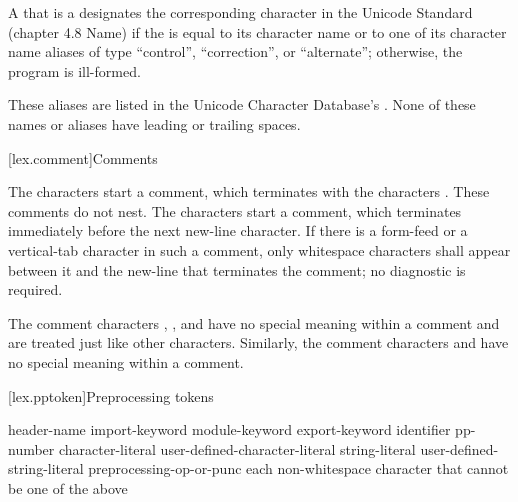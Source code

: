 \pnum
A 
that is a 
designates the corresponding character
in the Unicode Standard (chapter 4.8 Name)
if the  is equal
to its character name or
to one of its character name aliases of
type ``control'', ``correction'', or ``alternate'';
otherwise, the program is ill-formed.
\begin{note}
These aliases are listed in
the Unicode Character Database's .
None of these names or aliases have leading or trailing spaces.
\end{note}

[lex.comment]{Comments}

\pnum
{}%
%
%
The characters \tcode{/*} start a comment, which terminates with the
characters \tcode{*/}. These comments do not nest.
%
The characters \tcode{//} start a comment, which terminates immediately before the
next new-line character. If there is a form-feed or a vertical-tab
character in such a comment, only whitespace characters shall appear
between it and the new-line that terminates the comment; no diagnostic
is required.
\begin{note}
The comment characters \tcode{//}, \tcode{/*},
and \tcode{*/} have no special meaning within a \tcode{//} comment and
are treated just like other characters. Similarly, the comment
characters \tcode{//} and \tcode{/*} have no special meaning within a
\tcode{/*} comment.
\end{note}

[lex.pptoken]{Preprocessing tokens}

%
\begin{bnf}
\br
    header-name\br
    import-keyword\br
    module-keyword\br
    export-keyword\br
    identifier\br
    pp-number\br
    character-literal\br
    user-defined-character-literal\br
    string-literal\br
    user-defined-string-literal\br
    preprocessing-op-or-punc\br
    \textnormal{each non-whitespace character that cannot be one of the above}
\end{bnf}

